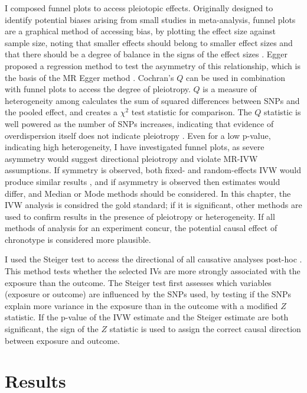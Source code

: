 \documentclass[journal,article,submit,moreauthors,pdftex]{Definitions/mdpi}
\begin{document}
I composed funnel plots to access pleiotopic effects. Originally designed to identify potential biases arising from small studies in meta-analysis, funnel plots are a graphical method of accessing bias, by plotting the effect size against sample size, noting that smaller effects should belong to smaller effect sizes and that there should be a degree of balance in the signs of the effect sizes \citep{eggerBiasMetaanalysisDetected1997a}. Egger proposed a regression method to test the asymmetry of this relationship, which is the basis of the MR Egger method \citep{bowdenMendelianRandomizationInvalid2015b}. Cochran's $Q$ can be used in combination with funnel plots to access the degree of pleiotropy. $Q$ is a measure of heterogeneity among calculates the sum of squared differences between SNPs and the pooled effect, and creates a $\chi^2$ test statistic for comparison. The $Q$ statistic is well powered as the number of SNPs increases, indicating that evidence of overdispersion itself does not indicate pleiotropy \citep{Lawlor_2008,Rees_wood, burgess_review_2017}. Even for a low p-value, indicating high heterogeneity, I have investigated funnel plots, as severe asymmetry would suggest directional pleiotropy and violate MR-IVW assumptions. If symmetry is observed, both fixed- and random-effects IVW would produce similar results \cite{bowden_framework_2017}, and if asymmetry is observed then estimates would differ, and Median or Mode methods should be considered. In this chapter, the IVW analysis is considred the gold standard; if it is significant, other methods are used to confirm results in the presence of pleiotropy or heterogeneity. If all methods of analysis for an experiment concur, the potential causal effect of chronotype is considered more plausible.

I used the Steiger test to access the directional of all causative analyses post-hoc \citep{hemaniOrientingCausalRelationship2017}.  This method tests whether the selected IVs are more strongly associated with the exposure than the outcome. The Steiger test first assesses which variables (exposure or outcome) are influenced by the SNPs used, by testing if the SNPs explain more variance in the exposure than in the outcome with a modified $Z$ statistic. If the p-value of the IVW estimate and the Steiger estimate are both significant, the sign of the $Z$ statistic is used to assign the correct causal direction between exposure and outcome.




\section{Results}
\end{document}
